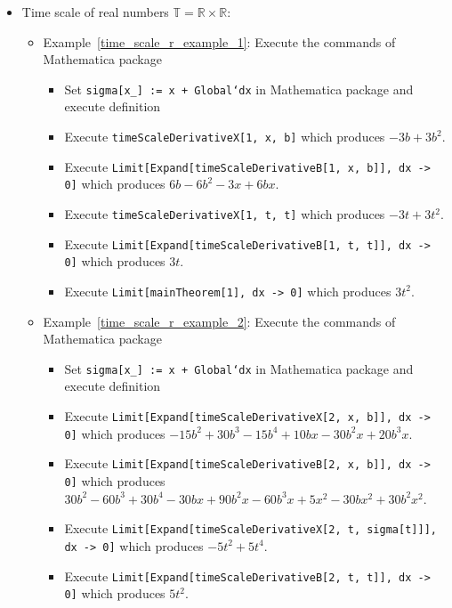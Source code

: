 \begin{itemize}
\begin{itemize}
\begin{itemize}
        \end{itemize}
    \end{itemize}
    \item Time scale of real numbers $\mathbb{T} = \mathbb{R} \times \mathbb{R}$:
    \begin{itemize}
        \item Example~\ref{time_scale_r_example_1}:
        Execute the commands of Mathematica package
        \begin{itemize}
            \item Set \texttt{sigma[x\_] := x + Global`dx} in Mathematica package and execute definition
            \item Execute \texttt{timeScaleDerivativeX[1, x, b]} which produces $-3 b + 3 b^2$.
            \item Execute \texttt{Limit[Expand[timeScaleDerivativeB[1, x, b]], dx -> 0]}
            which produces $6 b - 6 b^2 - 3 x + 6 b x$.
            \item Execute \texttt{timeScaleDerivativeX[1, t, t]} which produces $-3 t + 3 t^2$.
            \item Execute \texttt{Limit[Expand[timeScaleDerivativeB[1, t, t]], dx -> 0]} which produces $3t$.
            \item Execute \texttt{Limit[mainTheorem[1], dx -> 0]} which produces $3t^2$.
        \end{itemize}
        \item Example~\ref{time_scale_r_example_2}:
        Execute the commands of Mathematica package
        \begin{itemize}
            \item Set \texttt{sigma[x\_] := x + Global`dx} in Mathematica package and execute definition
            \item Execute \texttt{Limit[Expand[timeScaleDerivativeX[2, x, b]], dx -> 0]}
            which produces $-15 b^2 + 30 b^3 - 15 b^4 + 10 b x - 30 b^2 x + 20 b^3 x$.
            \item Execute \texttt{Limit[Expand[timeScaleDerivativeB[2, x, b]], dx -> 0]}
            which produces $30 b^2 - 60 b^3 + 30 b^4 - 30 b x + 90 b^2 x - 60 b^3 x + 5 x^2 -
            30 b x^2 + 30 b^2 x^2$.
            \item Execute \texttt{Limit[Expand[timeScaleDerivativeX[2, t, sigma[t]]], dx -> 0]} which produces $-5 t^2 + 5 t^4$.
            \item Execute \texttt{Limit[Expand[timeScaleDerivativeB[2, t, t]], dx -> 0]} which produces $5t^2$.

\end{itemize}
\end{itemize}
\end{itemize}
